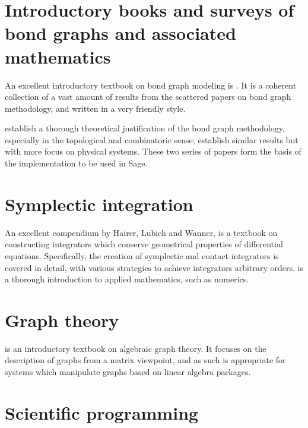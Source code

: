 \documentclass[utf8,a4paper,12pt]{report}
\begin{document}
\section{Introductory books and surveys of bond graphs and associated mathematics}
An excellent introductory textbook on bond graph modeling is \cite{Borutzky2010}. It is a coherent collection of a vast amount of results from the scattered papers on bond graph methodology, and written in a very friendly style.

\cite{Birkett1989,Birkett1989a,Birkett1990,Birkett1990a,Birkett2002,Birkett2002a} establish a thorough theoretical justification of the bond graph methodology, especially in the topological and combinatoric sense; \cite{Lamb1997b,Lamb1997,Lamb1997a} establish similar results but with more focus on physical systems. These two series of papers form the basis of the implementation to be used in Sage.
\section{Symplectic integration}
An excellent compendium by Hairer, Lubich and Wanner, \cite{Hairer} is a textbook on constructing integrators which conserve geometrical properties of differential equations. Specifically, the creation of symplectic and contact integrators is covered in detail, with various strategies to achieve integrators arbitrary orders. \cite{Holmes2009} is a thorough introduction to applied mathematics, such as numerics.
\section{Graph theory}
\cite{Knauer2011} is an introductory textbook on algebraic graph theory. It focuses on the description of graphs from a matrix viewpoint, and as such is appropriate for systems which manipulate graphs based on linear algebra packages.
\section{Scientific programming}



\nocite{*}
\end{document}
